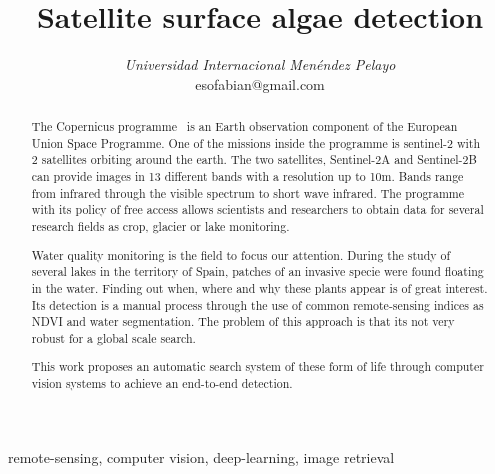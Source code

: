 \documentclass[conference]{IEEEtran}
\begin{document}
    \title{Satellite surface algae detection}

    \author{
    \textit{Universidad Internacional Menéndez Pelayo}\\
    esofabian@gmail.com}

    \maketitle

    \begin{abstract}
        The Copernicus programme~\citep{whatiscopernicus} is an Earth observation component of the European Union Space
        Programme.
        One of the missions inside the programme is sentinel-2\citep{sentinel-2} with 2 satellites orbiting around the
        earth.
        The two satellites, Sentinel-2A and Sentinel-2B can provide images in 13 different bands with a resolution up
        to 10m.
        Bands range from infrared through the visible spectrum to short wave infrared.
        The programme with its policy of free access allows scientists and researchers to obtain data for several
        research fields as crop, glacier or lake monitoring.

        Water quality monitoring is the field to focus our attention.
        During the study of several lakes in the territory of Spain, patches of an invasive specie were found
        floating in the water.
        Finding out when, where and why these plants appear is of great interest.
        Its detection is a manual process through the use of common remote-sensing indices as NDVI\citep{NDVIsource}
        and water segmentation.
        The problem of this approach is that its not very robust for a global scale search.

        This work proposes an automatic search system of these form of life through computer vision systems to
        achieve an end-to-end detection.
    \end{abstract}

    \begin{IEEEkeywords}
        remote-sensing, computer vision, deep-learning, image retrieval
    \end{IEEEkeywords}
\end{document}
